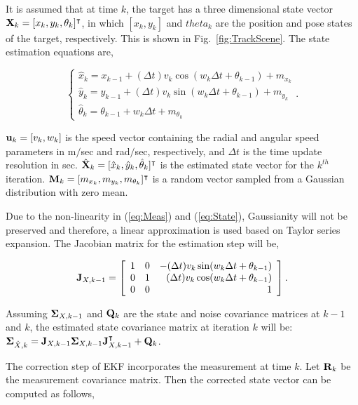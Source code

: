 It is assumed that at time $k$, the target has a three dimensional state vector ${\bf X}_k = [x_k, y_k, \theta_k]^\intercal$, in which $[x_k, y_k]$ and $theta_k$ are the position and pose states of the target, respectively. This is shown in Fig.~\ref{fig:TrackScene}. The state estimation equations are,

\begin{equation}
\left\{
\begin{array}{l}
\hat{x}_k = x_{k-1} + (\Delta t) v_k \cos(w_k \Delta t + \theta_{k-1}) + m_{x_k} \\
\hat{y}_k = y_{k-1} + (\Delta t) v_k \sin(w_k \Delta t + \theta_{k-1}) + m_{y_k} \\
\hat{\theta}_k = \theta_{k-1} + w_k \Delta t + m_{\theta_k}
\end{array}
\right..
\label{eq:State}
\end{equation}

\noindent ${\bf u}_k = [v_k, w_k]$ is the speed vector containing the radial and angular speed parameters in m$/$sec and rad$/$sec, respectively, and $\Delta t$ is the time update resolution in sec. $\hat{{\bf X}}_k = [\hat{x}_k, \hat{y}_k, \hat{\theta}_k]^\intercal$ is the estimated state vector for the $k^{th}$ iteration. ${\bf M}_k = [m_{x_k}, m_{y_k}, m_{\theta_k}]^\intercal$ is a random vector sampled from a Gaussian distribution with zero mean. 

Due to the non-linearity in (\ref{eq:Meas}) and (\ref{eq:State}), Gaussianity will not be preserved and therefore, a linear approximation is used based on Taylor series expansion. 
The Jacobian matrix for the estimation step will be,

\begin{equation}
{\bf J}_{X, k-1} = \left[
\begin{array}{llr}
1 & 0 & -(\Delta t) v_k \sin(w_k \Delta t + \theta_{k-1}) \\
0 & 1 &  (\Delta t) v_k \cos(w_k \Delta t + \theta_{k-1}) \\
0 & 0 & 1 
\end{array}
 \right].
\end{equation}

\noindent Assuming ${\bf \Sigma}_{{X}, k-1}$ and ${\bf Q}_{k}$ are the state and noise covariance matrices at $k-1$ and $k$, the estimated state covariance matrix at iteration $k$ will be: ${\bf \Sigma}_{\hat{X}, k} = {\bf J}_{X, k-1}{\bf \Sigma}_{X, k-1}{\bf J}_{X, k-1}^\intercal + {\bf Q}_{k}$.

The correction step of EKF incorporates the measurement at time $k$. Let ${\bf R}_k$ be the measurement covariance matrix. Then the corrected state vector can be computed as follows,

